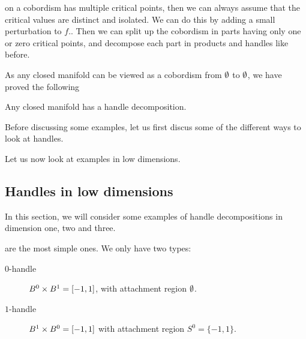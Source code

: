  on a cobordism has multiple critical points, then we can always assume that the critical values are distinct and isolated.
We can do this by adding a small perturbation to $f$..
Then we can split up the cobordism in parts having only one or zero critical points, and decompose each part in products and handles like before.

As any closed manifold can be viewed as a cobordism from $\emptyset$ to $\emptyset$, we have proved the following

\begin{theorem}
    Any closed manifold has a handle decomposition.
\end{theorem}

Before discussing some examples, let us first discus some of the different ways to look at handles.


Let us now look at examples in low dimensions.
\subsection{Handles in low dimensions}
In this section, we will consider some examples of handle decompositions in dimension one, two and three.

 are the most simple ones. We only have two types:

\begin{description}
    \item[$0$-handle] $B^{0} \times B^{1} = [-1, 1]$, with attachment region $\emptyset$.  \hfill {} 
        
    \item[$1$-handle]   $B^{1} \times  B^{0} = [-1, 1]$ with attachment region $S^{0} = \{-1, 1\}$.  \hfill {}
\end{description}

